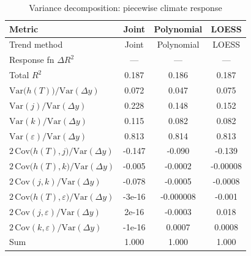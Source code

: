 \begin{table}[htbp]
\centering
\caption{Variance decomposition: piecewise climate response}
\label{tab:variance_decomp_piecewise}

\small
\begin{tabular}{@{}lccc@{}}
\toprule
Metric & Joint & Polynomial & LOESS \\
\midrule
Trend method & Joint & Polynomial & LOESS \\
\midrule
Response fn $\Delta R^2$ & — & — & — \\
Total $R^2$ & 0.187 & 0.186 & 0.187 \\
\midrule
$\mathrm{Var}\!\big(h(T)\big)/\mathrm{Var}(\Delta y)$ & 0.072 & 0.047 & 0.075 \\
$\mathrm{Var}(j)/\mathrm{Var}(\Delta y)$ & 0.228 & 0.148 & 0.152 \\
$\mathrm{Var}(k)/\mathrm{Var}(\Delta y)$ & 0.115 & 0.082 & 0.082 \\
$\mathrm{Var}(\varepsilon)/\mathrm{Var}(\Delta y)$ & 0.813 & 0.814 & 0.813 \\
\midrule
$2\,\mathrm{Cov}\!\big(h(T),j\big)/\mathrm{Var}(\Delta y)$ & -0.147 & -0.090 & -0.139 \\
$2\,\mathrm{Cov}\!\big(h(T),k\big)/\mathrm{Var}(\Delta y)$ & -0.005 & -0.0002 & -0.00008 \\
$2\,\mathrm{Cov}(j,k)/\mathrm{Var}(\Delta y)$ & -0.078 & -0.0005 & -0.0008 \\
$2\,\mathrm{Cov}\!\big(h(T),\varepsilon\big)/\mathrm{Var}(\Delta y)$ & -3e-16 & -0.000008 & -0.001 \\
$2\,\mathrm{Cov}(j,\varepsilon)/\mathrm{Var}(\Delta y)$ & 2e-16 & -0.0003 & 0.018 \\
$2\,\mathrm{Cov}(k,\varepsilon)/\mathrm{Var}(\Delta y)$ & -1e-16 & 0.0007 & 0.0008 \\
\midrule
Sum & 1.000 & 1.000 & 1.000 \\
\bottomrule
\end{tabular}
\end{table}